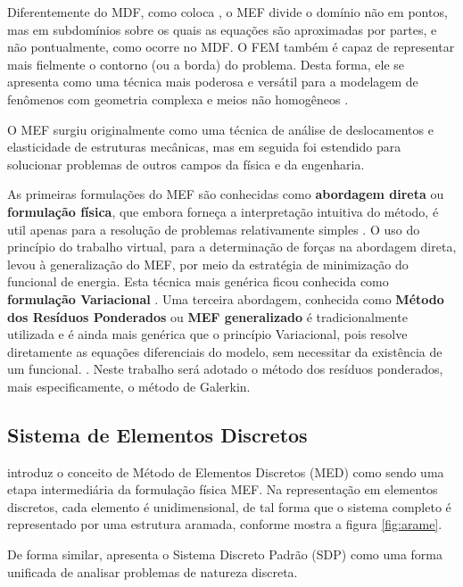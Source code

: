 Diferentemente do MDF, como coloca \citep[p. 4]{huebner}, o MEF divide o domínio não em pontos, mas em subdomínios sobre os quais as equações são aproximadas por partes, e não pontualmente, como ocorre no MDF. O FEM também é capaz de representar mais fielmente o contorno (ou a borda) do problema. Desta forma, ele se apresenta como uma técnica mais poderosa e versátil para a modelagem de fenômenos com geometria complexa e meios não homogêneos \citep[p. 390]{sadiku}. 

O MEF surgiu originalmente como uma técnica de análise de deslocamentos e elasticidade de estruturas mecânicas, mas em seguida foi estendido para solucionar problemas de outros campos da física e da engenharia. \citep[p. 19]{jin} \citep[p. 3]{desai} \citep[p. 2]{zien}

As primeiras formulações do MEF são conhecidas como \textbf{abordagem direta} ou \textbf{formulação física}, que embora forneça a interpretação intuitiva do método, é util apenas para a resolução de problemas relativamente simples \citep[p. 6]{huebner}. O uso do princípio do trabalho virtual, para a determinação de forças na abordagem direta, levou à generalização do MEF, por meio da estratégia de minimização do funcional de energia. Esta técnica mais genérica  ficou conhecida como \textbf{formulação Variacional} \citep[p. 113]{desai} \citep[p. 20]{zien}. Uma terceira abordagem, conhecida como \textbf{Método dos Resíduos Ponderados} ou \textbf{MEF generalizado} \citep[p. 61]{zien} é tradicionalmente utilizada e é ainda mais genérica que o princípio Variacional, pois resolve diretamente as equações diferenciais do modelo, sem necessitar da existência de um funcional. \citep[p. 261]{desai}. Neste trabalho será adotado o método dos resíduos ponderados, mais especificamente, o método de Galerkin.


\subsection{Sistema de Elementos Discretos}
\citep[p. 68]{desai} introduz o conceito de Método de Elementos Discretos (MED) como sendo uma etapa intermediária da formulação física MEF. Na representação em elementos discretos, cada elemento é unidimensional, de tal forma que o sistema completo é representado por uma estrutura aramada, conforme mostra a figura \ref{fig:arame}.

De forma similar, \citep[p. 2]{zien} apresenta o Sistema Discreto Padrão (SDP) como uma forma unificada de analisar problemas de natureza discreta.

